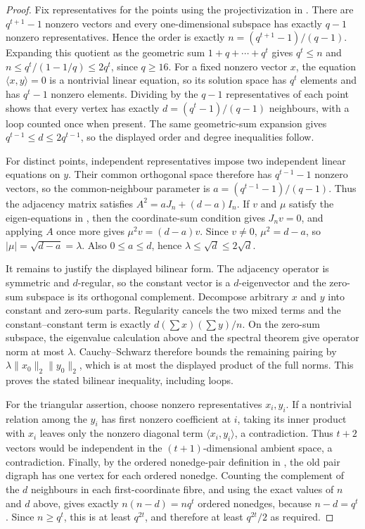 \begin{proof}
Fix representatives for the points using the projectivization in
.  There are $q^{t+1}-1$ nonzero vectors and every
one-dimensional subspace has exactly $q-1$ nonzero representatives.  Hence
the order is exactly $n=(q^{t+1}-1)/(q-1)$.  Expanding this quotient as the
geometric sum $1+q+\cdots+q^t$ gives $q^t\leq n$ and
$n\leq q^t/(1-1/q)\leq2q^t$, since $q\geq16$.  For a fixed nonzero vector
$x$,
the equation $\langle x,y\rangle=0$ is a nontrivial linear equation, so its
solution space has $q^t$ elements and has $q^t-1$ nonzero elements.  Dividing
by the $q-1$ representatives of each point shows that every vertex has
exactly $d=(q^t-1)/(q-1)$ neighbours, with a loop counted once when present.
The same geometric-sum expansion gives $q^{t-1}\leq d\leq2q^{t-1}$, so the
displayed order and degree inequalities follow.

For distinct points, independent representatives impose two independent
linear equations on $y$.  Their common orthogonal space therefore has
$q^{t-1}-1$ nonzero vectors, so the common-neighbour parameter is
$a=(q^{t-1}-1)/(q-1)$.  Thus the adjacency matrix satisfies
$A^2=aJ_n+(d-a)I_n$.  If $v$ and $\mu$ satisfy the eigen-equations in
, then the coordinate-sum condition gives
$J_nv=0$, and applying $A$ once more gives $\mu^2v=(d-a)v$.  Since $v\ne0$,
$\mu^2=d-a$, so $|\mu|=\sqrt{d-a}=\lambda$.  Also $0\leq a\leq d$, hence
$\lambda\leq\sqrt d\leq2\sqrt d$.

It remains to justify the displayed bilinear form.  The adjacency operator is
symmetric and $d$-regular, so the constant vector is a $d$-eigenvector and
the zero-sum subspace is its orthogonal complement.  Decompose arbitrary
$x$ and $y$ into constant and zero-sum parts.  Regularity cancels the two
mixed terms and the constant--constant term is exactly
$d(\sum x)(\sum y)/n$.  On the zero-sum subspace, the eigenvalue calculation
above and the spectral theorem give operator norm at most $\lambda$.
Cauchy--Schwarz therefore bounds the remaining pairing by
$\lambda\|x_0\|_2\|y_0\|_2$, which is at most the displayed product of the
full norms.  This proves the stated bilinear inequality, including loops.

For the triangular assertion, choose nonzero representatives $x_i,y_i$.
If a nontrivial relation among the $y_i$ has first nonzero coefficient at
$i$, taking its inner product with $x_i$ leaves only the nonzero diagonal
term $\langle x_i,y_i\rangle$, a contradiction.  Thus $t+2$ vectors would
be independent in the $(t+1)$-dimensional ambient space, a contradiction.
Finally, by the ordered nonedge-pair definition in
, the old pair digraph has one vertex for each
ordered nonedge.  Counting the complement of the $d$ neighbours in each
first-coordinate fibre, and using the exact values of $n$ and $d$ above, gives
exactly $n(n-d)=nq^t$ ordered nonedges, because $n-d=q^t$.  Since
$n\geq q^t$, this is at least $q^{2t}$, and therefore at least
$q^{2t}/2$ as required.
\end{proof}
